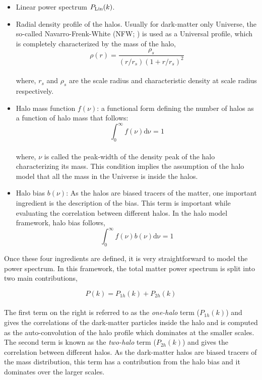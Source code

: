 \begin{itemize}
	\item Linear power spectrum $P_{\rm Lin}(k)$.

	\item Radial density profile of the halos. 
			Usually for dark-matter only 	Universe, the so-called
			Navarro-Frenk-White (NFW; \cite{1997ApJ...490..493N}) 
			is used as a Universal profile, which is completely characterized by the
			mass of the halo,
			\begin{equation}
				\rho(r) = \dfrac{\rho_s}{(r/r_s)(1+r/r_s)^2}
			\end{equation}
			\\
			where, $r_s$ and $\rho_s$ are the scale radius and characteristic density at scale radius
			respectively.

	\item Halo mass function $f(\nu)$: a functional form defining the number of halos as a function of halo
			mass that follows:
			\begin{equation}
				\int_0^{\infty} f(\nu)\mathrm{d\nu} = 1
			\end{equation}
			\\
			where, $\nu$ is called the peak-width of the density peak of the halo 
			characterizing its mass. This condition implies the assumption of the
			halo model that all the mass in the Universe is inside the halos. 

	\item Halo bias $b(\nu)$: As the halos are biased tracers of the matter, one important ingredient is 
			the description of the bias. This term is important while evaluating the correlation
			between different halos. In the halo model framework, halo bias follows,
			\begin{equation}
				\int_0^{\infty} f(\nu) b(\nu) \mathrm{d\nu} = 1
			\end{equation}
\end{itemize}

Once these four ingredients are defined, 
it is very straightforward to model the power spectrum. In this framework, the
total matter power spectrum is split into two main contributions,

\begin{equation}
	P(k) = P_{1h}(k)  + P_{2h}(k)
\end{equation}
\\
The first term on the right is referred to as the {\it one-halo} term ($P_{1h}(k)$) and gives
the correlations of the dark-matter particles inside the halo and is computed as
the auto-convolution of the halo profile which dominates at the smaller scales. 
The second term is known as the {\it two-halo}
term ($P_{2h}(k)$) and gives the correlation between different halos. As the 
dark-matter halos are biased tracers of the mass distribution, this term has a 
contribution from the halo bias and it dominates over the larger scales. 

